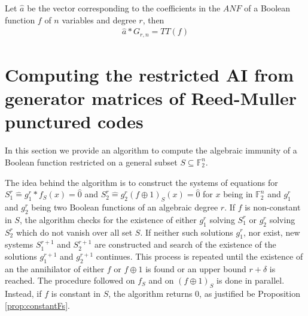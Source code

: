\documentclass[11pt]{llncs}
\begin{document}
\begin{remark}
	Let $\hat{a}$ be the vector corresponding to the coefficients in the $ANF$ of a Boolean function $f$ of $n$ variables and degree $r$, then
	\begin{align*}
	\hat{a} * G_{r,n} = TT(f)
	\end{align*}
\end{remark}




















\section{Computing the restricted AI from generator matrices of Reed-Muller punctured codes}\label{sec:RMapproach}

In this section we provide an algorithm to compute the algebraic immunity of a Boolean function restricted on a general subset $S \subseteq \mathbb{F}_2^n$. 



The idea behind the algorithm is to construct the systems of equations for $S_1^r \hat{=}g_1^r*f_S (x)= \hat{0}$ and $S_2^r\hat{=}g_2^r (f\oplus 1)_S (x) = \hat{0}$ for $x$ being in $\mathbb{F}_2^n$ and $g_1^r$ and $g_2^r$ being two Boolean functions of an algebraic degree $r$.
If $f$ is non-constant in $S$, the algorithm checks for the existence of either $g_1^r$ solving $S_1^r$ or $g_2^r$ solving $S_2^r$ which do not vanish over all set $S$. If neither such solutions $g_1^r$, nor exist, new systems $S_1^{r+1}$ and $S_2^{r+1}$ are constructed and search of the existence of the solutions $g_{1}^{r+1}$ and $g_2^{r+1}$ continues. This process is repeated until the existence of an the annihilator of either $f$ or $f\oplus 1$ is found or an upper bound $r+\delta$ is reached. The procedure followed on $f_S$ and on $(f\oplus 1)_S$ is done in parallel.
Instead, if $f$ is constant in $S$, the algorithm returns $0$, as justified be Proposition \ref{prop:constantFs}.
\end{document}
